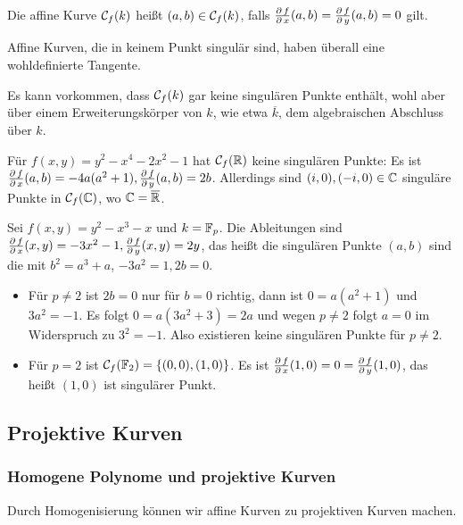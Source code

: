 \begin{defn}
	Die affine Kurve $\mathcal{C}_f(k)$ heißt  $(a,b) \in \mathcal{C}_f(k)$, falls $\frac{\operatorname{\partial} f}{\operatorname{\partial} x}(a,b) = \frac{\operatorname{\partial} f}{\operatorname{\partial} y}(a,b) = 0$ gilt. 
\end{defn}

\begin{bem}
	Affine Kurven, die in keinem Punkt singulär sind, haben überall eine wohldefinierte Tangente.
\end{bem}

\begin{bem}
	Es kann vorkommen, dass $\mathcal{C}_f(k)$ gar keine singulären Punkte enthält, wohl aber über einem Erweiterungskörper von $k$, wie etwa $\overline{k}$, dem algebraischen Abschluss über $k$.
\end{bem}

\begin{bsp}
	Für $f(x,y) = y^2 - x^4 - 2x^2 - 1$ hat $\mathcal{C}_f(\mathbb{R})$ keine singulären Punkte: Es ist $\frac{\der f}{\der x}(a,b) = -4a(a^2+1),\linebreak \frac{\der f}{\der y}(a,b) = 2b$. Allerdings sind $(i,0),(-i,0) \in \mathbb{C}$ singuläre Punkte in $\mathcal{C}_f(\mathbb{C})$, wo $\mathbb{C} = \overline{\mathbb{R}}$.
\end{bsp}

\begin{bsp}
	Sei $f(x,y) = y^2 - x^3 - x$ und $k = \mathbb{F}_p$. Die Ableitungen sind $\frac{\operatorname{\partial} f}{\operatorname{\partial} x} (x,y) = -3x^2-1, \frac{\operatorname{\partial} f}{\operatorname{\partial} y}(x,y) = 2y$, das heißt die singulären Punkte $(a,b)$ sind die mit $b^2 = a^3 + a$, $-3a^2 = 1, 2b=0$.\begin{itemize}
		\item Für $p \neq 2$ ist $2b = 0$ nur für $b = 0$ richtig, dann ist $0 = a(a^2+1)$ und $3a^2 = -1$. Es folgt $0 = a(3a^2 + 3) = 2a$ und wegen $p \neq 2$ folgt $a = 0$ im Widerspruch zu $3^2=-1$. Also existieren keine singulären Punkte für $p \neq 2$.
		\item Für $p = 2$ ist $\mathcal{C}_f(\mathbb{F}_2) = \{(0,0),(1,0)\}$. Es ist $\frac{\operatorname{\partial} f}{\operatorname{\partial} x} (1,0) = 0 = \frac{\operatorname{\partial} f}{\operatorname{\partial} y}(1,0)$, das heißt $(1,0)$ ist singulärer Punkt.
	\end{itemize}
\end{bsp}

\nextlecture
\newpage
\subsection{Projektive Kurven}
\subsubsection{Homogene Polynome und projektive Kurven}
\label{sub:2.3} \label{subsub:2.3.1}
	Durch Homogenisierung können wir affine Kurven zu projektiven Kurven machen. \marginnote{[9]}
	
